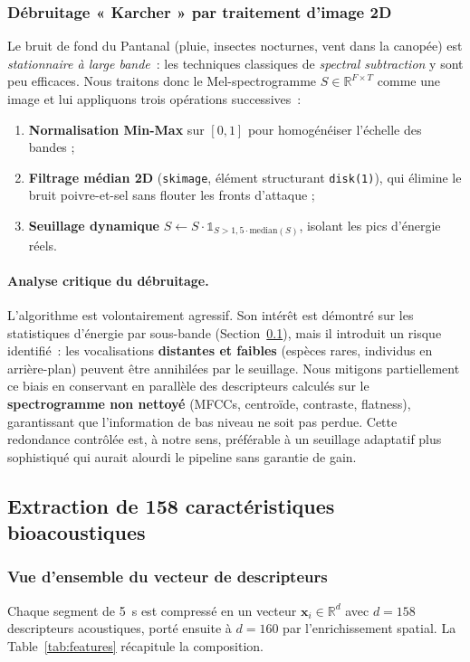 \subsubsection{Débruitage « Karcher » par traitement d'image 2D}
Le bruit de fond du Pantanal (pluie, insectes nocturnes, vent dans la
canopée) est \textit{stationnaire à large bande}~: les techniques
classiques de \textit{spectral subtraction} y sont peu efficaces.
Nous traitons donc le Mel-spectrogramme $S \in \mathbb{R}^{F \times T}$
comme une image et lui appliquons trois opérations successives~:
\begin{enumerate}
    \item \textbf{Normalisation Min-Max} sur $[0,1]$ pour homogénéiser
          l'échelle des bandes ;
    \item \textbf{Filtrage médian 2D} (\texttt{skimage}, élément structurant
          \texttt{disk(1)}), qui élimine le bruit poivre-et-sel sans flouter les
          fronts d'attaque ;
    \item \textbf{Seuillage dynamique} $S \leftarrow S \cdot \mathds{1}_{S
                  > 1{,}5 \cdot \mathrm{median}(S)}$, isolant les pics d'énergie réels.
\end{enumerate}

\paragraph{Analyse critique du débruitage.} L'algorithme est volontairement
agressif. Son intérêt est démontré sur les statistiques d'énergie par
sous-bande (Section~\ref{sec:features}), mais il introduit un risque
identifié~: les vocalisations \textbf{distantes et faibles} (espèces
rares, individus en arrière-plan) peuvent être annihilées par le seuillage.
Nous mitigons partiellement ce biais en conservant en parallèle des
descripteurs calculés sur le \textbf{spectrogramme non nettoyé} (MFCCs,
centroïde, contraste, flatness), garantissant que l'information de bas
niveau ne soit pas perdue. Cette redondance contrôlée est, à notre sens,
préférable à un seuillage adaptatif plus sophistiqué qui aurait alourdi
le pipeline sans garantie de gain.

\subsection{Extraction de 158 caractéristiques bioacoustiques}
\label{sec:features}

\subsubsection{Vue d'ensemble du vecteur de descripteurs}
Chaque segment de 5~s est compressé en un vecteur
$\mathbf{x}_i \in \mathbb{R}^{d}$ avec $d=158$ descripteurs acoustiques,
porté ensuite à $d=160$ par l'enrichissement spatial. La
Table~\ref{tab:features} récapitule la composition.

